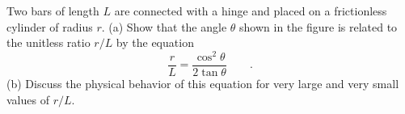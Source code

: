 Two bars of length $L$ are connected with a hinge and
placed on a frictionless cylinder of radius $r$. (a) Show
that the angle $\theta $ shown in the figure is related to
the unitless ratio $r/L$ by the equation
\begin{equation*}
 \frac{r}{L} = \frac{\cos^2\theta}{2\tan\theta} \qquad .
\end{equation*}\hwendpart
(b) Discuss the physical behavior of this equation for very
large and very small values of $r/L$.
